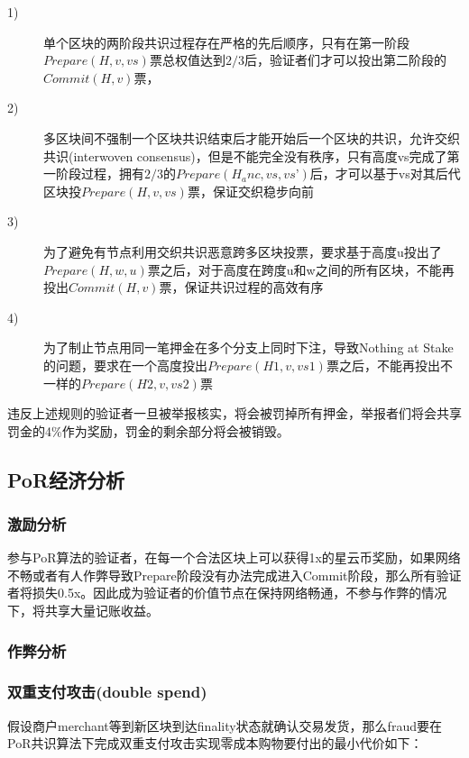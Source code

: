 \begin{description}
\item[1)] 单个区块的两阶段共识过程存在严格的先后顺序，只有在第一阶段$Prepare(H, v, vs)$票总权值达到$2/3$后，验证者们才可以投出第二阶段的$Commit(H, v)$票，
\item[2)] 多区块间不强制一个区块共识结束后才能开始后一个区块的共识，允许交织共识(interwoven consensus)，但是不能完全没有秩序，只有高度vs完成了第一阶段过程，拥有$2/3$的$Prepare(H_anc, vs, vs’)$后，才可以基于vs对其后代区块投$Prepare(H, v, vs)$票，保证交织稳步向前
\item[3)] 为了避免有节点利用交织共识恶意跨多区块投票，要求基于高度u投出了$Prepare(H, w, u)$票之后，对于高度在跨度u和w之间的所有区块，不能再投出$Commit(H, v)$票，保证共识过程的高效有序
\item[4)] 为了制止节点用同一笔押金在多个分支上同时下注，导致Nothing at Stake的问题，要求在一个高度投出$Prepare(H1, v, vs1)$票之后，不能再投出不一样的$Prepare(H2, v, vs2)$票
\end{description}

违反上述规则的验证者一旦被举报核实，将会被罚掉所有押金，举报者们将会共享罚金的4\%作为奖励，罚金的剩余部分将会被销毁。

\subsection{PoR经济分析}
\label{por:economic}

\subsubsection{激励分析}
\label{por:economic:incentive}

参与PoR算法的验证者，在每一个合法区块上可以获得1x的星云币奖励，如果网络不畅或者有人作弊导致Prepare阶段没有办法完成进入Commit阶段，那么所有验证者将损失0.5x。因此成为验证者的价值节点在保持网络畅通，不参与作弊的情况下，将共享大量记账收益。

\subsubsection{作弊分析}
\label{por:economic:fraud}

\subsubsection*{双重支付攻击(double spend)}
\label{por:economic:fraud:double_spend}

假设商户merchant等到新区块到达finality状态就确认交易发货，那么fraud要在PoR共识算法下完成双重支付攻击实现零成本购物要付出的最小代价如下：

